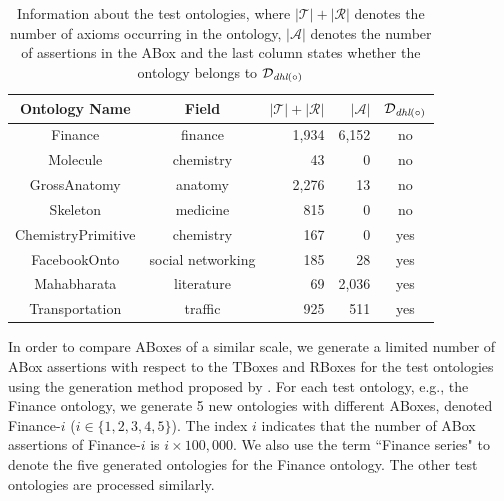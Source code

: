 \begin{table}[htb]
\centering
\caption{Information about the test ontologies, where
  $|\mathcal{T}|+|\mathcal{R}|$ denotes the number of axioms occurring
  in the ontology, $|\mathcal{A}|$ denotes the number of assertions
  in the ABox and the last column states whether the
  ontology belongs to $\mathcal{D}_{\textit{\text{dhl}}(\circ)}$}
\begin{tabular}{>{\hspace*{5mm}}ccrrc<{\hspace*{5mm}}}
\hline
\textbf{Ontology Name} & \textbf{Field} &
                                          $|\mathcal{T}|+|\mathcal{R}|$
  & $|\mathcal{A}|$ & $\mathcal{D}_{\textit{\text{dhl}}(\circ)}$\\
\hline

Finance&finance&1,934&6,152&no\\

Molecule&chemistry&43&0&no\\

GrossAnatomy&anatomy&2,276&13&no\\

Skeleton&medicine&815&0&no\\

\hline

ChemistryPrimitive&chemistry&167&0& yes\\

FacebookOnto&social networking&185&28& yes\\

Mahabharata&literature&69&2,036& yes\\

Transportation&traffic&925&511& yes\\

\hline
\end{tabular}
\label{tab:info}
\end{table}

In order to compare ABoxes of a similar scale, we generate a limited
number of ABox assertions with respect to the TBoxes and RBoxes for
the test ontologies using the generation method proposed by
\citet{Elhaik98}.  For each test ontology, e.g., the Finance ontology,
we generate 5 new ontologies with different ABoxes, denoted
Finance-$i$ ($i\in\{1,2,3,4,5\}$). The index $i$ indicates that the
number of ABox assertions of Finance-$i$ is $i\times100,000$. We also
use the term ``Finance series" to denote the five generated ontologies
for the Finance ontology. The other test ontologies are processed
similarly.

